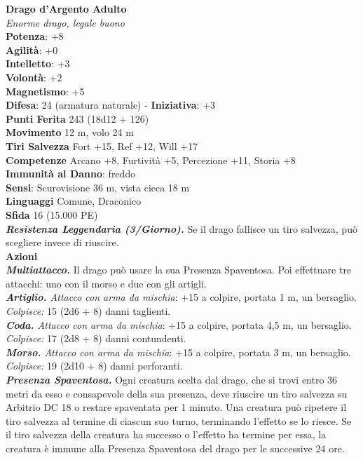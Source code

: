 \begin{multicols}{2}
\medskip\textbf{Drago d'Argento Adulto}\\
\emph{Enorme drago, legale buono}\\
\textbf{Potenza}: +8\\
\textbf{Agilità}: +0\\
\textbf{Intelletto}: +3\\
\textbf{Volontà}: +2\\
\textbf{Magnetismo}: +5\\
\textbf{Difesa}: 24 (armatura naturale) - \textbf{Iniziativa}: +3\\
\textbf{Punti Ferita} 243 (18d12 + 126)\\
\textbf{Movimento} 12 m, volo 24 m\\
\textbf{Tiri Salvezza} Fort +15, Ref +12, Will +17\\
\textbf{Competenze} Arcano +8, Furtività +5, Percezione +11, Storia +8\\
\textbf{Immunità al Danno}: freddo\\
\textbf{Sensi}: Scurovisione 36 m, vista cieca 18 m\\
\textbf{Linguaggi} Comune, Draconico\\
\textbf{Sfida} 16 (15.000 PE)\smallskip\\
\emph{\textbf{Resistenza Leggendaria (3/Giorno).}} Se il drago fallisce un tiro salvezza, può scegliere invece di riuscire.\\
\smallskip\textbf{Azioni}\\
\emph{\textbf{Multiattacco.}} Il drago può usare la sua Presenza Spaventosa. Poi effettuare tre attacchi: uno con il morso e due con gli artigli.\\
\emph{\textbf{Artiglio.} Attacco con arma da mischia}: +15 a colpire, portata 1 m, un bersaglio.\\
\emph{Colpisce:} 15 (2d6 + 8) danni taglienti.\\
\emph{\textbf{Coda.} Attacco con arma da mischia}: +15 a colpire, portata 4,5 m, un bersaglio.\\
\emph{Colpisce:} 17 (2d8 + 8) danni contundenti.\\
\emph{\textbf{Morso.} Attacco con arma da mischia}: +15 a colpire, portata 3 m, un bersaglio.\\
\emph{Colpisce:} 19 (2d10 + 8) danni perforanti.\\
\emph{\textbf{Presenza Spaventosa.}} Ogni creatura scelta dal drago, che si trovi entro 36 metri da esso e consapevole della sua presenza, deve riuscire un tiro salvezza su Arbitrio DC 18 o restare spaventata per 1 minuto. Una creatura può ripetere il tiro salvezza al termine di ciascun suo turno, terminando l'effetto se lo riesce. Se il tiro salvezza della creatura ha successo o l'effetto ha termine per essa, la creatura è immune alla Presenza Spaventosa del drago per le successive 24 ore.\\

\end{multicols}
